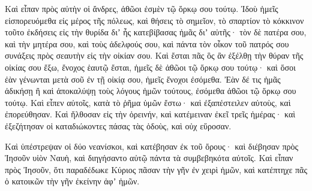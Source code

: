 {\par }{\PP {}Καὶ εἶπαν πρὸς αὐτὴν οἱ ἄνδρες, ἀθῶοι ἐσμὲν τῷ ὅρκῳ σου τούτῳ.
Ἰδοὺ ἡμεῖς εἰσπορευόμεθα εἰς μέρος τῆς πόλεως, καὶ θήσεις τὸ σημεῖον, τὸ σπαρτίον τὸ κόκκινον τοῦτο ἐκδήσεις εἰς τὴν θυρίδα διʼ ἧς κατεβίβασας ἡμᾶς διʼ αὐτῆς· τὸν δὲ πατέρα σου, καὶ τὴν μητέρα σου, καὶ τοὺς ἀδελφούς σου, καὶ πάντα τὸν οἶκον τοῦ πατρός σου συνάξεις πρὸς σεαυτὴν εἰς τὴν οἰκίαν σου.
Καὶ ἔσται πᾶς ὃς ἂν ἐξέλθῃ τὴν θύραν τῆς οἰκίας σου ἔξω, ἔνοχος ἑαυτῷ ἔσται, ἡμεῖς δὲ ἀθῶοι τῷ ὅρκῳ σου τούτῳ· καὶ ὅσοι ἐὰν γένωνται μετὰ σοῦ ἐν τῇ οἰκίᾳ σου, ἡμεῖς ἔνοχοι ἐσόμεθα.
Ἐὰν δέ τις ἡμᾶς ἀδικήσῃ ἢ καὶ ἀποκαλύψῃ τοὺς λόγους ἡμῶν τούτους, ἐσόμεθα ἀθῶοι τῷ ὅρκῳ σου τούτῳ.
Καὶ εἶπεν αὐτοῖς, κατὰ τὸ ῥῆμα ὑμῶν ἔστω· καὶ ἐξαπέστειλεν αὐτοὺς, καὶ ἐπορεύθησαν.
Καὶ ἤλθοσαν εἰς τὴν ὀρεινήν, καὶ κατέμειναν ἐκεῖ τρεῖς ἡμέρας· καὶ ἐξεζήτησαν οἱ καταδιώκοντες πάσας τὰς ὁδοὺς, καὶ οὐχ εὕροσαν.
\par }{\PP {}Καὶ ὑπέστρεψαν οἱ δύο νεανίσκοι, καὶ κατέβησαν ἐκ τοῦ ὄρους· καὶ διέβησαν πρὸς Ἰησοῦν υἱὸν Ναυὴ, καὶ διηγήσαντο αὐτῷ πάντα τὰ συμβεβηκότα αὐτοῖς.
Καὶ εἶπαν πρὸς Ἰησοῦν, ὅτι παραδέδωκε Κύριος πᾶσαν τὴν γῆν ἐν χειρὶ ἡμῶν, καὶ κατέπτηχε πᾶς ὁ κατοικῶν τὴν γῆν ἐκείνην ἀφʼ ἡμῶν.

}
